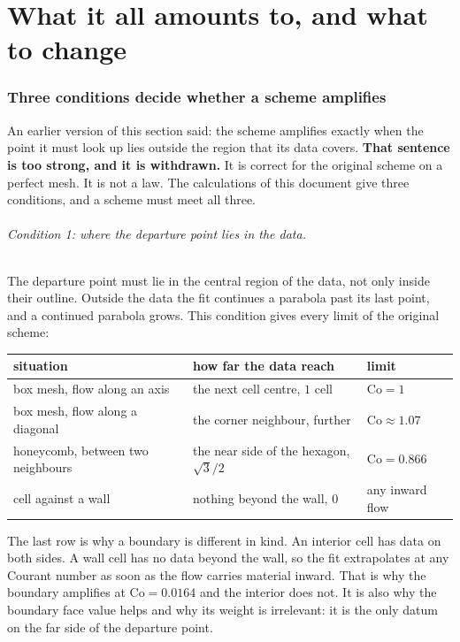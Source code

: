 \documentclass[11pt,a4paper]{article}
\begin{document}
\part{What it all amounts to, and what to change}

\section{Three conditions decide whether a scheme amplifies}
\label{sec:principle}

An earlier version of this section said: the scheme amplifies exactly when the point it must
look up lies outside the region that its data covers. \textbf{That sentence is too strong, and
it is withdrawn.} It is correct for the original scheme on a perfect mesh. It is not a law.
The calculations of this document give three conditions, and a scheme must meet all three.

\paragraph{Condition 1: where the departure point lies in the data.}
The departure point must lie in the central region of the data, not only inside their outline.
Outside the data the fit continues a parabola past its last point, and a continued parabola
grows. This condition gives every limit of the original scheme:

\begin{center}
\begin{tabular}{lll}
\toprule
situation & how far the data reach & limit \\
\midrule
box mesh, flow along an axis   & the next cell centre, $1$ cell   & $\mathrm{Co} = 1$ \\
box mesh, flow along a diagonal & the corner neighbour, further   & $\mathrm{Co} \approx 1.07$ \\
honeycomb, between two neighbours & the near side of the hexagon, $\sqrt3/2$ & $\mathrm{Co} = 0.866$ \\
cell against a wall & nothing beyond the wall, $0$ & any inward flow \\
\bottomrule
\end{tabular}
\end{center}

The last row is why a boundary is different in kind. An interior cell has data on both sides.
A wall cell has no data beyond the wall, so the fit extrapolates at any Courant number as soon
as the flow carries material inward. That is why the boundary amplifies at
$\mathrm{Co} = 0.0164$ and the interior does not. It is also why the boundary face value helps
and why its weight is irrelevant: it is the only datum on the far side of the departure point.
\end{document}
